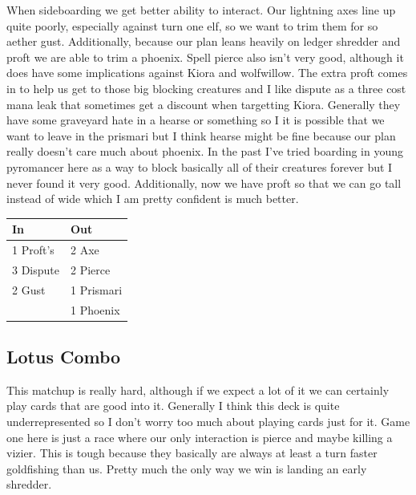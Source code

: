 \documentclass[12pt]{article}
\begin{document}
When sideboarding we get better ability to interact. Our lightning axes line up quite poorly, especially against turn one elf, so we want to trim them for so aether gust. Additionally, because our plan leans heavily on ledger shredder and proft we are able to trim a phoenix. Spell pierce also isn't very good, although it does have some implications against Kiora and wolfwillow. The extra proft comes in to help us get to those big blocking creatures and I like dispute as a three cost mana leak that sometimes get a discount when targetting Kiora. Generally they have some graveyard hate in a hearse or something so I it is possible that we want to leave in the prismari but I think hearse might be fine because our plan really doesn't care much about phoenix. In the past I've tried boarding in young pyromancer here as a way to block basically all of their creatures forever but I never found it very good. Additionally, now we have proft so that we can go tall instead of wide which I am pretty confident is much better.

\begin{center}
    \begin{tabular}{|l|l|}
        \hline
        In        & Out        \\
        \hline
        1 Proft's & 2 Axe      \\
        3 Dispute & 2 Pierce   \\
        2 Gust    & 1 Prismari \\
                  & 1 Phoenix  \\
        \hline
    \end{tabular}
\end{center}

\subsection{Lotus Combo}
This matchup is really hard, although if we expect a lot of it we can certainly play cards that are good into it. Generally I think this deck is quite underrepresented so I don't worry too much about playing cards just for it. Game one here is just a race where our only interaction is pierce and maybe killing a vizier. This is tough because they basically are always at least a turn faster goldfishing than us. Pretty much the only way we win is landing an early shredder.
\end{document}
